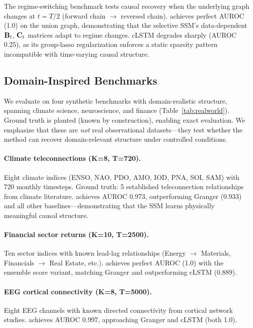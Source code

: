 

The regime-switching benchmark tests causal recovery when the
underlying graph changes at $t = T/2$ (forward chain $\to$ reversed
chain). \methodname{} achieves perfect AUROC (1.0) on the union graph,
demonstrating that the selective SSM's data-dependent $\mathbf{B}_t$, $\mathbf{C}_t$
matrices adapt to regime changes. cLSTM degrades sharply (AUROC 0.25),
as its group-lasso regularization enforces a static sparsity pattern
incompatible with time-varying causal structure.

\subsection{Domain-Inspired Benchmarks}
\label{sec:realworld}

We evaluate on four synthetic benchmarks with domain-realistic structure,
spanning climate science, neuroscience, and finance
(Table~\ref{tab:realworld}). Ground truth is planted (known by
construction), enabling exact evaluation. We emphasize that these are
\emph{not} real observational datasets---they test whether the method
can recover domain-relevant structure under controlled conditions.

\paragraph{Climate teleconnections (K=8, T=720).}
Eight climate indices (ENSO, NAO, PDO, AMO, IOD, PNA, SOI, SAM)
with 720 monthly timesteps. Ground truth: 5 established
teleconnection relationships from climate literature. \methodname{}
achieves AUROC 0.973, outperforming Granger (0.933) and all other
baselines---demonstrating that the SSM learns physically meaningful
causal structure.

\paragraph{Financial sector returns (K=10, T=2500).}
Ten sector indices with known lead-lag relationships (Energy $\to$
Materials, Financials $\to$ Real Estate, etc.). \methodname{}
achieves perfect AUROC (1.0) with the ensemble score variant,
matching Granger and outperforming cLSTM (0.889).

\paragraph{EEG cortical connectivity (K=8, T=5000).}
Eight EEG channels with known directed connectivity from cortical
network studies. \methodname{} achieves AUROC 0.997, approaching
Granger and cLSTM (both 1.0).

